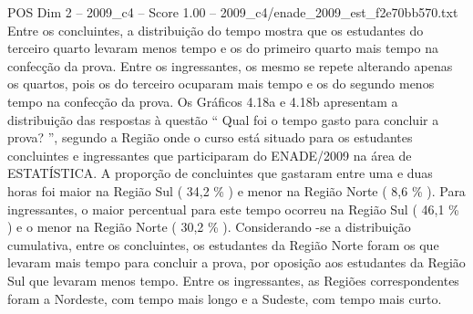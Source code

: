 \begin{textsample}{POS Dim 2 – 2009\_c4 – Score 1.00 – 2009\_c4/enade\_2009\_est\_f2e70bb570.txt}
Entre os concluintes, a distribuição do tempo mostra que os estudantes do terceiro quarto levaram menos tempo e os do primeiro quarto mais tempo na confecção da prova.
Entre os ingressantes, os mesmo se repete alterando apenas os quartos, pois os do terceiro ocuparam mais tempo e os do segundo menos tempo na confecção da prova.
Os Gráficos 4.18a e 4.18b apresentam a distribuição das respostas à questão “ Qual foi o tempo gasto para concluir a prova? ”, segundo a Região onde o curso está situado para os estudantes concluintes e ingressantes que participaram do ENADE/2009 na área de ESTATÍSTICA.
A proporção de concluintes que gastaram entre uma e duas horas foi maior na Região Sul ( 34,2 \% ) e menor na Região Norte ( 8,6 \% ).
Para ingressantes, o maior percentual para este tempo ocorreu na Região Sul ( 46,1 \% ) e o menor na Região Norte ( 30,2 \% ).
Considerando -se a distribuição cumulativa, entre os concluintes, os estudantes da Região Norte foram os que levaram mais tempo para concluir a prova, por oposição aos estudantes da Região Sul que levaram menos tempo.
Entre os ingressantes, as Regiões correspondentes foram a Nordeste, com tempo mais longo e a Sudeste, com tempo mais curto.

\end{textsample}
